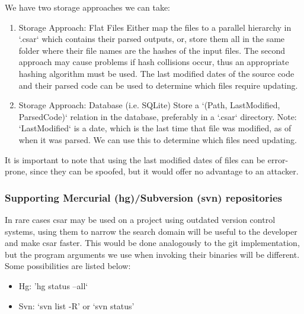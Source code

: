 \documentclass[12pt, letterpaper]{article}
\begin{document}
We have two storage approaches we can take:
\begin{enumerate}
  \item Storage Approach: Flat Files\newline
  Either map the files to a parallel hierarchy in `.csar` which contains their parsed outputs, or, store them all in the same folder where their file names are the hashes of the input files.
  The second approach may cause problems if hash collisions occur, thus an appropriate hashing algorithm must be used.
  The last modified dates of the source code and their parsed code can be used to determine which files require updating.
  \item Storage Approach: Database (i.e. SQLite)\newline
  Store a `(Path, LastModified, ParsedCode)` relation in the database, preferably in a `.csar` directory.
  Note: `LastModified` is a date, which is the last time that file was modified, as of when it was parsed.
  We can use this to determine which files need updating.
\end{enumerate}

It is important to note that using the last modified dates of files can be error-prone, since they can be spoofed, but it would offer no advantage to an attacker.

\subsubsection{Supporting Mercurial (hg)/Subversion (svn) repositories}
In rare cases csar may be used on a project using outdated version control systems, using them to narrow the search domain will be useful to the developer and make csar faster.
This would be done analogously to the git implementation, but the program arguments we use when invoking their binaries will be different.
Some possibilities are listed below:
\begin{itemize}
  \item Hg: 'hg status --all`
  \item Svn: `svn list -R' or `svn status'
\end{itemize}
\end{document}
